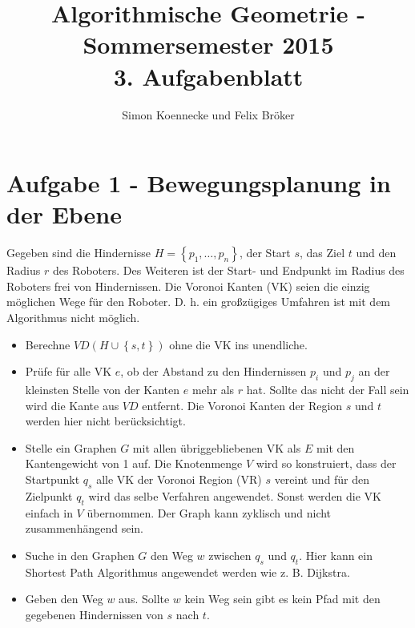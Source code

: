 \documentclass[a4paper]{article}
\begin{document}
\title{Algorithmische Geometrie - Sommersemester 2015\\
       3. Aufgabenblatt }
\author{Simon Koennecke und Felix Bröker}
\date{}
\maketitle

\section*{Aufgabe 1 - Bewegungsplanung in der Ebene}

Gegeben sind die Hindernisse $H = \left\{p_1, \dots, p_n\right\}$, der Start $s$, das Ziel $t$ und den Radius $r$ des Roboters. Des Weiteren ist der Start- und Endpunkt im Radius des Roboters frei von Hindernissen. Die Voronoi Kanten (VK) seien die einzig möglichen Wege für den Roboter. D. h. ein großzügiges Umfahren ist mit dem Algorithmus nicht möglich.

\begin{itemize}

\item Berechne $VD(H \cup \left\{s,t\right\})$ ohne die VK ins unendliche.

\item Prüfe für alle VK $e$, ob der Abstand zu den Hindernissen $p_i$ und $p_j$ an der kleinsten Stelle von der Kanten $e$ mehr als $r$ hat. Sollte das nicht der Fall sein wird die Kante aus $VD$ entfernt. Die Voronoi Kanten der Region $s$ und $t$ werden hier nicht berücksichtigt.

\item Stelle ein Graphen $G$ mit allen übriggebliebenen VK als $E$ mit den Kantengewicht von 1 auf. Die Knotenmenge $V$ wird so konstruiert, dass der Startpunkt $q_s$ alle VK der Voronoi Region (VR) $s$ vereint und für den Zielpunkt $q_t$ wird das selbe Verfahren angewendet. Sonst werden die VK einfach in $V$ übernommen. Der Graph kann zyklisch und nicht zusammenhängend sein.

\item Suche in den Graphen $G$ den Weg $w$ zwischen $q_s$ und $q_t$. Hier kann ein Shortest Path Algorithmus angewendet werden wie z. B. Dijkstra.

\item Geben den Weg $w$ aus. Sollte $w$ kein Weg sein gibt es kein Pfad mit den gegebenen Hindernissen von $s$ nach $t$.

\end{itemize}  
\end{document}
